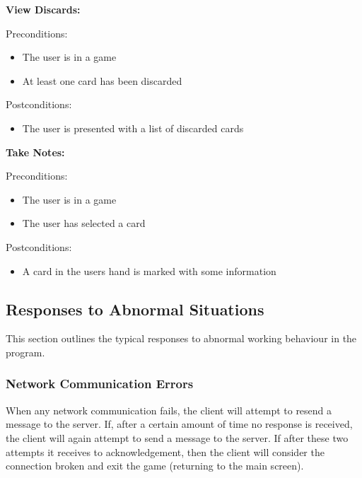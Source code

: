 \documentclass[12pt]{article}
\begin{document}
\begin{description}
\item
\begin{description}
	\item \textbf{View Discards:}
	\item Preconditions:
		\begin{itemize}
		\item The user is in a game
		\item At least one card has been discarded
		\end{itemize}	
	\item Postconditions:
		\begin{itemize}
		\item The user is presented with a list of discarded cards
		\end{itemize}
\end{description}


\item
\begin{description}
	\item \textbf{Take Notes:}
	\item Preconditions:
		\begin{itemize}
		\item The user is in a game
		\item The user has selected a card
		\end{itemize}	
	\item Postconditions:
		\begin{itemize}
		\item A card in the users hand is marked with some information
		\end{itemize}
\end{description}

\end{description}


\subsection{Responses to Abnormal Situations}

This section outlines the typical responses to abnormal working behaviour
in the program. 

\subsubsection{Network Communication Errors}
When any network communication fails, the client will attempt to resend a message
to the server.  If, after a certain amount of time no response is received, the
client will again attempt to send a message to the server.  If after these two
attempts it receives to acknowledgement, then the client will consider the connection
broken and exit the game (returning to the main screen).
\end{document}
